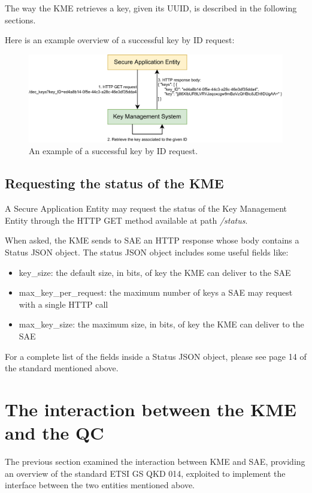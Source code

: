 The way the KME retrieves a key, given its UUID, is described in the following sections.

Here is an example overview of a successful key by ID request:

\begin{figure}[H]
    \centering
    \includegraphics[width=1.0\textwidth]{Images/get_key_by_id.png}
    \caption{An example of a successful key by ID request.}
    \label{fig:get_key_by_id}
\end{figure}

\subsection{Requesting the status of the KME}
A Secure Application Entity may request the status of the Key Management Entity through the HTTP GET method available at path \textit{/status}.

When asked, the KME sends to SAE an HTTP response whose body contains a Status JSON object. The status JSON object includes some useful fields like:

\begin{itemize}
    \item key\_size: the default size, in bits, of key the KME can deliver to the SAE
    \item max\_key\_per\_request: the maximum number of keys a SAE may request with a single HTTP call
    \item max\_key\_size: the maximum size, in bits, of key the KME can deliver to the SAE
\end{itemize}

For a complete list of the fields inside a Status JSON object, please see page 14 of the standard mentioned above. 

\section{The interaction between the KME and the QC}
\label{kme:qc}

The previous section examined the interaction between KME and SAE, providing an overview of the standard ETSI GS QKD 014, exploited to implement the interface between the two entities mentioned above.

